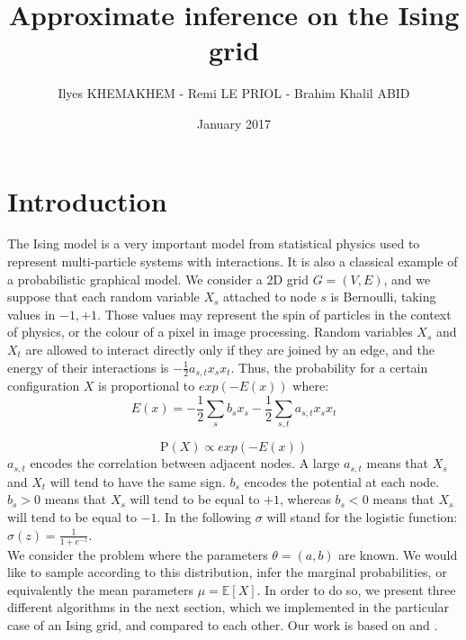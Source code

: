 \documentclass[a4paper]{article}
\title{Approximate inference on the Ising grid}
\author{Ilyes KHEMAKHEM - Remi LE PRIOL - Brahim Khalil ABID}
\date{January 2017}
\begin{document}
\maketitle

\section{Introduction}

    The Ising model is a very important model from statistical physics used to represent multi-particle systems with interactions. It is also a classical example of a probabilistic graphical model. We consider a 2D grid $G=(V,E)$, and we suppose that each random variable $X_s$ attached to node $s$ is Bernoulli, taking values in ${-1, +1}$. Those values may represent the spin of particles in the context of physics, or the colour of a pixel in image processing. Random variables $X_s$ and $X_t$ are allowed to interact directly only if they are joined by an edge, and the energy of their interactions is $-\frac{1}{2}a_{s,t}x_sx_t$. Thus, the probability for a certain configuration $X$ is proportional to $exp(-E(x))$ where:
    \begin{equation*}
    	E(x) = -\frac{1}{2} \sum_s b_sx_s - \frac{1}{2} \sum_{s,t}a_{s,t}x_sx_t
	\label{eq:energy}
    \end{equation*}
    
    \begin{equation*}
    	\mathrm{P}(X) \propto exp(-E(x))
	\label{eq:energy2}
    \end{equation*}
$a_{s,t}$ encodes the correlation between adjacent nodes. A large $a_{s,t}$ means that $X_s$ and $X_t$ will tend to have the
same sign. $b_s$ encodes the potential at each node. $b_s > 0$ means that $X_s$ will tend to be equal to $+1$, whereas $b_s < 0$ means that $X_s$ will tend to be equal to $-1$.
In the following $\sigma$ will stand for the logistic function: $\sigma (z) = \frac{1}{1+e^{-z}}.$
\\
We consider the problem where the parameters $\theta = (a,b)$ are known. We would like to sample according to this distribution, infer the marginal probabilities, or equivalently the mean parameters $\mu = \mathbb{E}[X]$. In order to do so, we present three different algorithms in the next section, which we implemented in the particular case of an Ising grid, and compared to each other. Our work is based on \cite{a1} and \cite{b1}.
\end{document}
